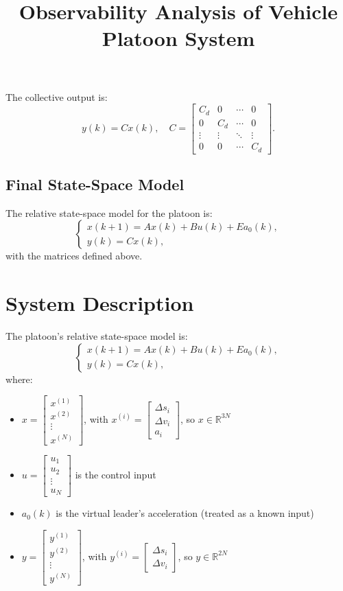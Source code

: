 \documentclass{article}
\begin{document}
The collective output is:
\[
y(k) = C x(k), \quad C = \begin{bmatrix}
C_d & 0 & \cdots & 0 \\
0 & C_d & \cdots & 0 \\
\vdots & \vdots & \ddots & \vdots \\
0 & 0 & \cdots & C_d
\end{bmatrix}.
\]

\subsection{Final State-Space Model}

The relative state-space model for the platoon is:
\[
\begin{cases}
x(k+1) = A x(k) + B u(k) + E a_0(k), \\
y(k) = C x(k),
\end{cases}
\]
with the matrices defined above.



\title{Observability Analysis of Vehicle Platoon System}


\section{System Description}
The platoon's relative state-space model is:
\[
\begin{cases}
x(k+1) = A x(k) + B u(k) + E a_0(k), \\
y(k) = C x(k),
\end{cases}
\]
where:
\begin{itemize}
\item $x = \begin{bmatrix} x^{(1)} \\ x^{(2)} \\ \vdots \\ x^{(N)} \end{bmatrix}$, with $x^{(i)} = \begin{bmatrix} \Delta s_i \\ \Delta v_i \\ a_i \end{bmatrix}$, so $x \in \mathbb{R}^{3N}$
\item $u = \begin{bmatrix} u_1 \\ u_2 \\ \vdots \\ u_N \end{bmatrix}$ is the control input
\item $a_0(k)$ is the virtual leader's acceleration (treated as a known input)
\item $y = \begin{bmatrix} y^{(1)} \\ y^{(2)} \\ \vdots \\ y^{(N)} \end{bmatrix}$, with $y^{(i)} = \begin{bmatrix} \Delta s_i \\ \Delta v_i \end{bmatrix}$, so $y \in \mathbb{R}^{2N}$
\end{itemize}
\end{document}
